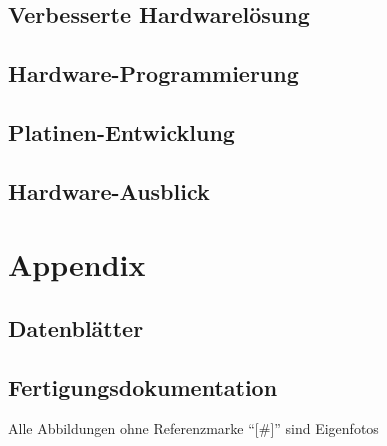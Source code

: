 \documentclass[a4paper, twoside, 12pt, openright, final]{memoir}
\newcommand{\AndreasGrain}{Andreas Grain}
\newcommand{\MatthiasMair}{Matthias Mair}
\newcommand{\authorName}{\AndreasGrain\ / \MatthiasMair}
\begin{document}
\chapter{Verbesserte Hardwarelösung}

\chapter{Hardware-Programmierung}

\chapter{Platinen-Entwicklung}

\chapter{Hardware-Ausblick}

\clearpage

\renewcommand{\authorName}{\AndreasGrain\ / \MatthiasMair}
\appendix
\part{Appendix}
\chapter{Datenblätter}

\chapter{Fertigungsdokumentation}

\printbibliography[title={Literatur und Quellen}]
\clearpage
{}
\printacronyms[heading=chapter*,name=Abkürzungen]
\clearpage
\listoffigures
Alle Abbildungen ohne Referenzmarke \enquote{[\#]} sind Eigenfotos
\clearpage
\listoftables
\end{document}
